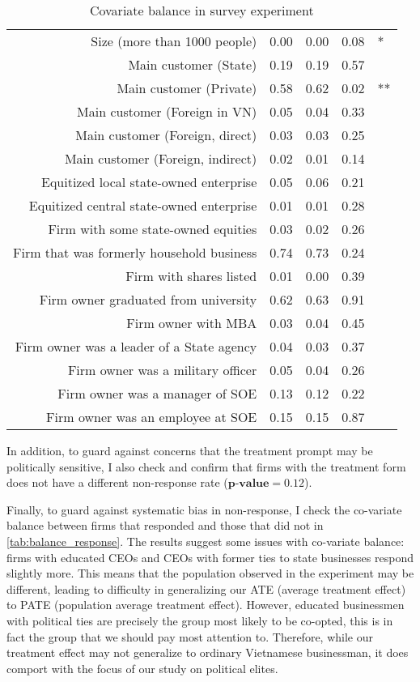 \begin{table}[ht]
\begin{tabular}{rrrrl}
  Size (more than 1000 people) & 0.00 & 0.00 & 0.08 & * \\ 
  Main customer (State) & 0.19 & 0.19 & 0.57 &  \\ 
  Main customer (Private) & 0.58 & 0.62 & 0.02 & ** \\ 
  Main customer (Foreign in VN) & 0.05 & 0.04 & 0.33 &  \\ 
  Main customer (Foreign, direct) & 0.03 & 0.03 & 0.25 &  \\ 
  Main customer (Foreign, indirect) & 0.02 & 0.01 & 0.14 &  \\ 
  Equitized local state-owned enterprise & 0.05 & 0.06 & 0.21 &  \\ 
  Equitized central state-owned enterprise & 0.01 & 0.01 & 0.28 &  \\ 
  Firm with some state-owned equities & 0.03 & 0.02 & 0.26 &  \\ 
  Firm that was formerly household business & 0.74 & 0.73 & 0.24 &  \\ 
  Firm with shares listed & 0.01 & 0.00 & 0.39 &  \\ 
  Firm owner graduated from university & 0.62 & 0.63 & 0.91 &  \\ 
  Firm owner with MBA & 0.03 & 0.04 & 0.45 &  \\ 
  Firm owner was a leader of a State agency & 0.04 & 0.03 & 0.37 &  \\ 
  Firm owner was a military officer & 0.05 & 0.04 & 0.26 &  \\ 
  Firm owner was a manager of SOE & 0.13 & 0.12 & 0.22 &  \\ 
  Firm owner was an employee at SOE & 0.15 & 0.15 & 0.87 &  \\ 
   \hline
\end{tabular}
\caption{Covariate balance in survey experiment}
\label{tab:balance}
\end{table}

In addition, to guard against concerns that the treatment prompt may be politically sensitive, I also check and confirm that firms with the treatment form does not have a different non-response rate ($\textbf{p-value} = 0.12$).

Finally, to guard against systematic bias in non-response, I check the co-variate balance between firms that responded and those that did not in \autoref{tab:balance_response}. The results suggest some issues with co-variate balance: firms with educated CEOs and CEOs with former ties to state businesses respond slightly more. This means that the population observed in the experiment may be different, leading to difficulty in generalizing our ATE (average treatment effect) to PATE (population average treatment effect). However, educated businessmen with political ties are precisely the group most likely to be co-opted, this is in fact the group that we should pay most attention to. Therefore, while our treatment effect may not generalize to ordinary Vietnamese businessman, it does comport with the focus of our study on political elites.

